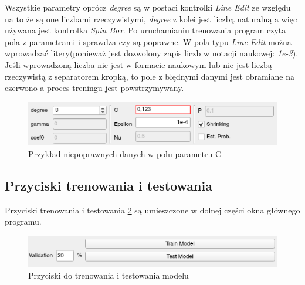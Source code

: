 \documentclass[paper=a4, fontsize=11pt]{scrartcl} %
\numberwithin{equation}{section} %
\numberwithin{figure}{section} %
\begin{document}
    \par Wszystkie parametry oprócz \textit{degree} są w postaci kontrolki \textit{Line Edit} ze
    względu na to że są one liczbami rzeczywistymi, \textit{degree} z kolei jest liczbą
    naturalną a więc używana jest kontrolka \textit{Spin Box}. Po uruchamianiu trenowania
    program czyta pola z parametrami i sprawdza czy są poprawne. W pola typu
    \textit{Line Edit} można wprowadzać litery(ponieważ jest dozwolony zapis liczb w notacji
    naukowej: \textit{1e-3}). Jeśli wprowadzoną liczba nie jest w formacie naukowym lub nie
    jest liczbą rzeczywistą z separatorem kropką, to pole z błędnymi danymi jest obramiane na
    czerwono a proces treningu jest powstrzymywany.

    \begin{figure}[H]
        \begin{center}
            \includegraphics[scale=1.0]{./img/svm_app_param_wrong.png}
            \caption{Przykład niepoprawnych danych w polu parametru C}
            \label{fig:param_wrong}
        \end{center}
    \end{figure}

\subsection{Przyciski trenowania i testowania}


    \par Przyciski trenowania i testowania \ref{fig:train_test_buttons} są umieszczone w dolnej
    części okna głównego programu.

    \begin{figure}[H]
        \begin{center}
            \includegraphics[scale=1.0]{./img/train_test_buttons.png}
            \caption{Przyciski do trenowania i testowania modelu}
            \label{fig:train_test_buttons}
        \end{center}
    \end{figure}
\end{document}
